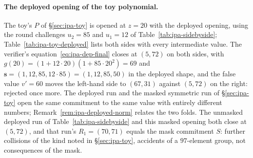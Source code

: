 \documentclass[11pt,a4paper]{article}
\theoremstyle{definition}
\begin{document}
\paragraph{The deployed opening of the toy polynomial.}
The toy's $P$ of \S\ref{sec:ipa-toy} is opened at $z = 20$ with the
deployed opening, using the round challenges $u_2 = 85$ and $u_1 = 12$
of Table~\ref{tab:ipa-sidebyside}; Table~\ref{tab:ipa-toy-deployed}
lists both sides with every intermediate value. The verifier's
equation~\eqref{eq:ipa-dep-final} closes at
$(5, 72)$ on both sides, with $g(20) = (1 + 12 \cdot 20)(1 + 85 \cdot
20^{2}) = 69$ and $\mathbf s = (1, 12, 85, 12 \cdot 85) = (1, 12, 85,
50)$ in the deployed shape, and the false value $v' = 60$ moves the
left-hand side to $(67, 31)$ against $(5, 72)$ on the right: rejected
once more. The deployed run and the masked symmetric run of
\S\ref{sec:ipa-toy} open the same commitment to the same value with
entirely different numbers; Remark~\ref{rem:ipa-deployed-norm} relates
the two folds. The unmasked deployed run of
Table~\ref{tab:ipa-sidebyside} and this masked opening both close at
$(5, 72)$, and that run's $R_1 = (70, 71)$ equals the mask commitment
$S$: further collisions of the kind noted in \S\ref{sec:ipa-toy},
accidents of a $97$-element group, not consequences of the mask.
\end{document}
